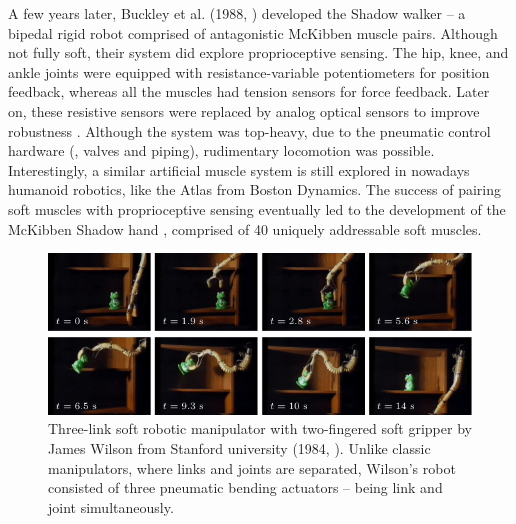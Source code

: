 A few years later, Buckley et al. (1988, \cite{Buckley2012}) developed the Shadow walker -- a bipedal rigid robot comprised of antagonistic McKibben muscle pairs. Although not fully soft, their system did explore proprioceptive sensing. The hip, knee, and ankle joints were equipped with resistance-variable potentiometers for position feedback, whereas all the muscles had tension sensors for force feedback. Later on, these resistive sensors were replaced by analog optical sensors to improve robustness \cite{Buckley2012}. Although the system was top-heavy, due to the pneumatic control hardware (\eg, valves and piping), rudimentary locomotion was possible. Interestingly, a similar artificial muscle system is still explored in nowadays humanoid robotics, like the Atlas from Boston Dynamics. The success of pairing soft muscles with proprioceptive sensing eventually led to the development of the McKibben Shadow hand \cite{Buckley2012,Gong2022Feb}, comprised of 40 uniquely addressable soft muscles. 

\begin{figure}[!t]
  \vspace{-2mm}
  \centering
  \includegraphics*[width=\textwidth]{./pdf/thesis-figure-2-6.pdf}
  \caption{Three-link soft robotic manipulator with two-fingered soft gripper by James Wilson from Stanford university (1984, \cite{Wilson2007}). Unlike classic manipulators, where links and joints are separated, Wilson's robot consisted of three pneumatic bending actuators -- being link and joint simultaneously. 
  \label{fig:C0:fist_srm_robot}}
\end{figure}

